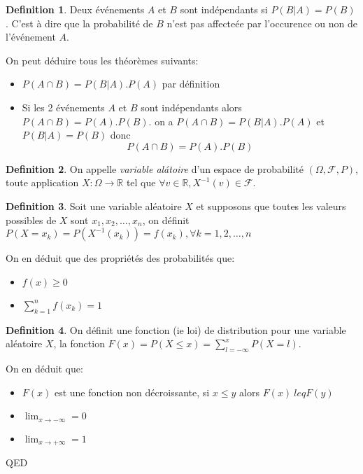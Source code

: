\documentclass[]{book}
\theoremstyle{definition}
\newtheorem{defn}{Definition}
\newcommand{\bb}[1]{\mathbb{#1}}
\newcommand{\R}{\bb{R}}
\begin{document}
\begin{defn}
Deux \'ev\'enements $A$ et $B$ sont ind\'ependants si $P(B|A) = P(B)$. C'est \`a dire que la probabilit\'e de $B$ n'est pas affecte\'ee par l'occurence ou non de l'\'ev\'enement $A$.  
\end{defn}

On peut d\'eduire tous les th\'eor\`emes suivants:
\begin{itemize}
\item $P(A \cap B) = P(B|A).P(A)$ par d\'efinition
\item Si les 2 \'ev\'enements $A$ et $B$ sont ind\'ependants alors $P(A \cap B) = P(A).P(B)$. on a $P(A \cap B) = P(B|A).P(A)$ et $P(B|A) = P(B)$ donc
$$P(A \cap B) = P(A).P(B)$$
\end{itemize}

\begin{defn}
On appelle \emph{variable al\'atoire} d'un espace de probabilit\'e $(\Omega, \mathscr{F}, P)$, toute application $X : \Omega \to \R$ tel que $\forall v \in \R, X^{-1}(v) \in \mathscr{F}$.
\end{defn}

\begin{defn}
Soit une variable al\'eatoire $X$ et supposons que toutes les valeurs possibles de $X$ sont $x_1, x_2, \ldots, x_n$, on d\'efinit $P(X=x_k) = P(X^{-1}(x_k)) = f(x_k), \forall k = 1, 2, \ldots, n$ 
\end{defn}

On en d\'eduit que des propri\'et\'es des probabilit\'es que:
\begin{itemize}
\item $f(x) \geq 0$ 
\item $\sum_{k=1}^{n}f(x_k) = 1$
\end{itemize}

\begin{defn}
On d\'efinit une fonction (ie loi) de distribution pour une variable al\'eatoire $X$, la fonction $F(x) = P(X \leq x) = \sum_{l = -\infty}^{x} P(X=l)$. 
\end{defn}

On en d\'eduit que:
\begin{itemize}
\item $F(x)$ est une fonction non d\'ecroissante, si $x \leq  y$ alors $F(x) \ leq F(y)$ 
\item $\lim_{x \to -\infty} = 0$
\item $\lim_{x \to +\infty} = 1$
\end{itemize}



QED
\end{document}
